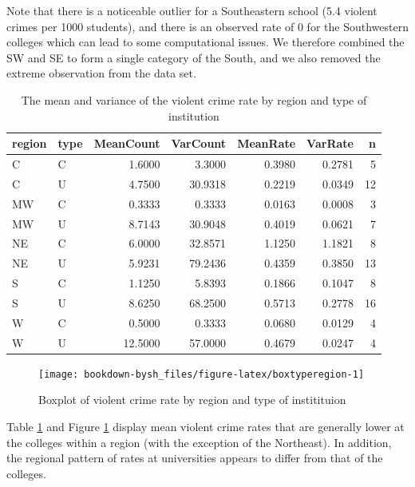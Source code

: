 \documentclass[
]{krantz}
\begin{document}
Note that there is a noticeable outlier for a Southeastern school (5.4 violent crimes per 1000 students), and there is an observed rate of 0 for the Southwestern colleges which can lead to some computational issues. We therefore combined the SW and SE to form a single category of the South, and we also removed the extreme observation from the data set.

\begin{table}

\caption{\label{tab:table4ch4}The mean and variance of the violent crime rate by region and type of institution}
\centering
\begin{tabular}[t]{llrrrrr}
\toprule
region & type & MeanCount & VarCount & MeanRate & VarRate & n\\
\midrule
C & C & 1.6000 & 3.3000 & 0.3980 & 0.2781 & 5\\
C & U & 4.7500 & 30.9318 & 0.2219 & 0.0349 & 12\\
MW & C & 0.3333 & 0.3333 & 0.0163 & 0.0008 & 3\\
MW & U & 8.7143 & 30.9048 & 0.4019 & 0.0621 & 7\\
NE & C & 6.0000 & 32.8571 & 1.1250 & 1.1821 & 8\\
\addlinespace
NE & U & 5.9231 & 79.2436 & 0.4359 & 0.3850 & 13\\
S & C & 1.1250 & 5.8393 & 0.1866 & 0.1047 & 8\\
S & U & 8.6250 & 68.2500 & 0.5713 & 0.2778 & 16\\
W & C & 0.5000 & 0.3333 & 0.0680 & 0.0129 & 4\\
W & U & 12.5000 & 57.0000 & 0.4679 & 0.0247 & 4\\
\bottomrule
\end{tabular}
\end{table}

\begin{figure}

{\centering \texttt{[image: bookdown-bysh\_files/figure-latex/boxtyperegion-1]} 

}

\caption{Boxplot of violent crime rate by region and type of institituion}\label{fig:boxtyperegion}
\end{figure}

Table \ref{tab:table4ch4} and Figure \ref{fig:boxtyperegion} display mean violent crime rates that are generally lower at the colleges within a region (with the exception of the Northeast). In addition, the regional pattern of rates at universities appears to differ from that of the colleges.
\end{document}
